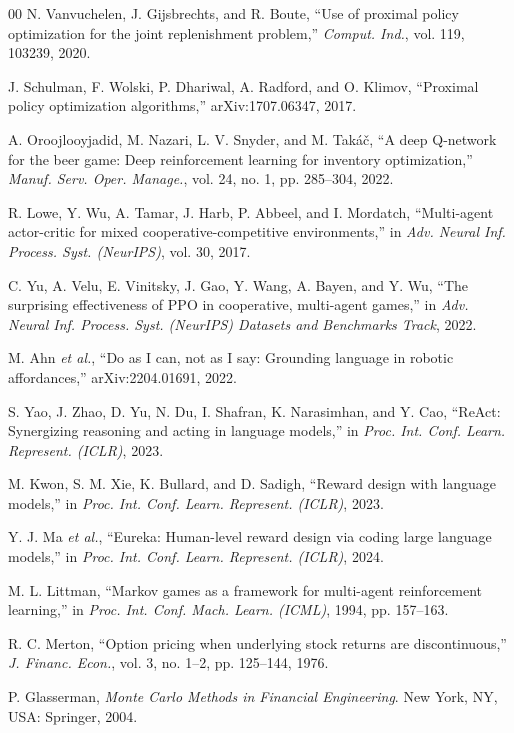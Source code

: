 \documentclass[conference]{IEEEtran}
\begin{document}
\begin{thebibliography}{00}
 N. Vanvuchelen, J. Gijsbrechts, and R. Boute, ``Use of proximal policy optimization for the joint replenishment problem,'' \emph{Comput. Ind.}, vol. 119, 103239, 2020.

 J. Schulman, F. Wolski, P. Dhariwal, A. Radford, and O. Klimov, ``Proximal policy optimization algorithms,'' arXiv:1707.06347, 2017.

 A. Oroojlooyjadid, M. Nazari, L. V. Snyder, and M. Tak\'{a}\v{c}, ``A deep Q-network for the beer game: Deep reinforcement learning for inventory optimization,'' \emph{Manuf. Serv. Oper. Manage.}, vol. 24, no. 1, pp. 285--304, 2022.

 R. Lowe, Y. Wu, A. Tamar, J. Harb, P. Abbeel, and I. Mordatch, ``Multi-agent actor-critic for mixed cooperative-competitive environments,'' in \emph{Adv. Neural Inf. Process. Syst. (NeurIPS)}, vol. 30, 2017.

 C. Yu, A. Velu, E. Vinitsky, J. Gao, Y. Wang, A. Bayen, and Y. Wu, ``The surprising effectiveness of PPO in cooperative, multi-agent games,'' in \emph{Adv. Neural Inf. Process. Syst. (NeurIPS) Datasets and Benchmarks Track}, 2022.

 M. Ahn \emph{et al.}, ``Do as I can, not as I say: Grounding language in robotic affordances,'' arXiv:2204.01691, 2022.

 S. Yao, J. Zhao, D. Yu, N. Du, I. Shafran, K. Narasimhan, and Y. Cao, ``ReAct: Synergizing reasoning and acting in language models,'' in \emph{Proc. Int. Conf. Learn. Represent. (ICLR)}, 2023.

 M. Kwon, S. M. Xie, K. Bullard, and D. Sadigh, ``Reward design with language models,'' in \emph{Proc. Int. Conf. Learn. Represent. (ICLR)}, 2023.

 Y. J. Ma \emph{et al.}, ``Eureka: Human-level reward design via coding large language models,'' in \emph{Proc. Int. Conf. Learn. Represent. (ICLR)}, 2024.

 M. L. Littman, ``Markov games as a framework for multi-agent reinforcement learning,'' in \emph{Proc. Int. Conf. Mach. Learn. (ICML)}, 1994, pp. 157--163.

 R. C. Merton, ``Option pricing when underlying stock returns are discontinuous,'' \emph{J. Financ. Econ.}, vol. 3, no. 1--2, pp. 125--144, 1976.

 P. Glasserman, \emph{Monte Carlo Methods in Financial Engineering}. New York, NY, USA: Springer, 2004.


\end{thebibliography}
\end{document}
